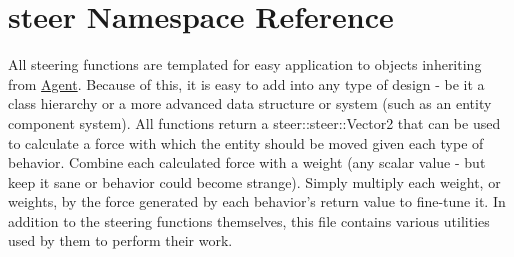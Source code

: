 \hypertarget{namespacesteer}{\section{steer Namespace Reference}
\label{namespacesteer}
}


All steering functions are templated for easy application to objects inheriting from \hyperlink{classsteer_1_1_agent}{Agent}. Because of this, it is easy to add into any type of design -\/ be it a class hierarchy or a more advanced data structure or system (such as an entity component system). All functions return a steer\-::steer\-::\-Vector2 that can be used to calculate a force with which the entity should be moved given each type of behavior. Combine each calculated force with a weight (any scalar value -\/ but keep it sane or behavior could become strange). Simply multiply each weight, or weights, by the force generated by each behavior's return value to fine-\/tune it. In addition to the steering functions themselves, this file contains various utilities used by them to perform their work.  


